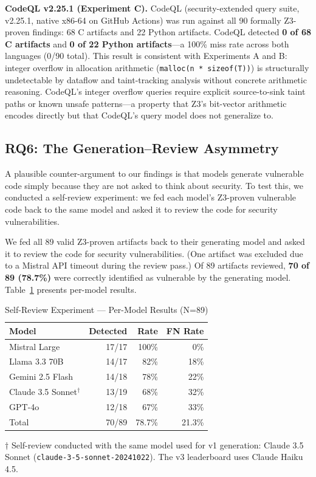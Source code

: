 \documentclass[10pt,twocolumn]{article}
\begin{document}
\textbf{CodeQL v2.25.1 (Experiment C).} CodeQL (security-extended query
suite, v2.25.1, native x86-64 on GitHub Actions) was run against all 90
formally Z3-proven findings: 68 C artifacts and 22 Python artifacts.
CodeQL detected \textbf{0 of 68 C artifacts} and \textbf{0 of 22 Python
artifacts}---a 100\% miss rate across both languages (0/90 total). This
result is consistent with Experiments A and B: integer overflow in
allocation arithmetic (\texttt{malloc(n * sizeof(T))}) is structurally
undetectable by dataflow and taint-tracking analysis without concrete
arithmetic reasoning. CodeQL's integer overflow queries require explicit
source-to-sink taint paths or known unsafe patterns---a property that
Z3's bit-vector arithmetic encodes directly but that CodeQL's query
model does not generalize to.

\subsection{RQ6: The Generation--Review Asymmetry}

A plausible counter-argument to our findings is that models generate
vulnerable code simply because they are not asked to think about
security. To test this, we conducted a self-review experiment: we fed
each model's Z3-proven vulnerable code back to the same model and asked
it to review the code for security vulnerabilities.

We fed all 89 valid Z3-proven artifacts back to their generating model
and asked it to review the code for security vulnerabilities. (One
artifact was excluded due to a Mistral API timeout during the review
pass.) Of 89 artifacts reviewed, \textbf{70 of
89 (78.7\%)} were correctly identified as vulnerable by the generating
model. Table~\ref{tab:selfreview} presents per-model results.

\begin{table}[h]
\centering
\caption{Self-Review Experiment --- Per-Model Results (N=89)}
\label{tab:selfreview}
\begin{tabular}{lrrr}
\toprule
\textbf{Model} & \textbf{Detected} & \textbf{Rate} & \textbf{FN Rate} \\
\midrule
Mistral Large    & 17/17 & 100\% & 0\%   \\
Llama 3.3 70B    & 14/17 & 82\%  & 18\%  \\
Gemini 2.5 Flash & 14/18 & 78\%  & 22\%  \\
Claude 3.5 Sonnet$^\dagger$ & 13/19 & 68\% & 32\% \\
GPT-4o           & 12/18 & 67\%  & 33\%  \\
\midrule
Total & 70/89 & 78.7\% & 21.3\% \\
\bottomrule
\end{tabular}

\smallskip
{\normalfont\footnotesize $\dagger$ Self-review conducted with the same model used for v1 generation: Claude 3.5 Sonnet (\texttt{claude-3-5-sonnet-20241022}). The v3 leaderboard uses Claude Haiku 4.5.}
\end{table}
\end{document}
